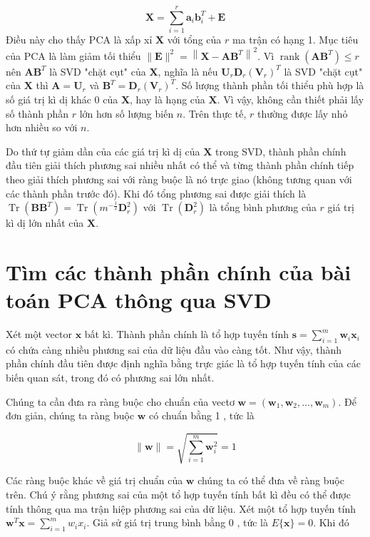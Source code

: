 \documentclass[14pt,oneside,a4paper]{report}
\numberwithin{equation}{section}
\begin{document}
$$
\mathbf{X}=\sum_{i=1}^{r} \mathbf{a}_{i} \mathbf{b}_{i}^{T}+\mathbf{E}
$$
Điều này cho thấy $\mathrm{PCA}$ là xấp xỉ $\mathbf{X}$ với tổng của $r$ ma trận có hạng 1.
Mục tiêu của PCA là làm giảm tối thiểu $\|\mathbf{E}\|^{2}=\left\|\mathbf{X}-\mathbf{A} \mathbf{B}^{T}\right\|^{2}$. Vì $\operatorname{rank}\left(\mathbf{A} \mathbf{B}^{T}\right) \leq r$ nên $\mathbf{A} \mathbf{B}^{T}$ là SVD "chặt cụt" của $\mathbf{X}$, nghĩa là nếu $\mathbf{U}_{r} \mathbf{D}_{r}\left(\mathbf{V}_{r}\right)^{T}$ là SVD "chặt cụt" của $\mathbf{X}$ thì $\mathbf{A}= \mathbf{U}_{r}$ và $\mathbf{B}^{T}= \mathbf{D}_{r}\left(\mathbf{V}_{r}\right)^{T}$. Số lượng thành phần tối thiểu phù hợp là số giá trị kì dị khác 0 của $\mathbf{X}$, hay là hạng của $\mathbf{X}$. Vì vậy, không cần thiết phải lấy số thành phần $r$ lớn hơn số lượng biến $n$. Trên thực tế, $r$ thường được lấy nhỏ hơn nhiều so với $n$.

Do thứ tự giảm dần của các giá trị kì dị của $\mathbf{X}$ trong SVD, thành phần chính đầu tiên giải thích phương sai nhiều nhất có thể và từng thành phần chính tiếp theo giải thích phương sai với ràng buộc là nó trực giao (không tương quan với các thành phần trước đó). Khi đó tổng phương sai được giải thích là $\operatorname{Tr}\left(\mathbf{B} \mathbf{B}^{T}\right)=\operatorname{Tr}\left(m^{-\frac{1}{2}} \mathbf{D}_{r}^{2}\right)$ với $\operatorname{Tr}\left(\mathbf{D}_{r}^{2}\right)$ là tổng bình phương của $r$ giá trị kì dị lớn nhất của $\mathbf{X}$.

\section{Tìm các thành phần chính của bài toán PCA thông qua SVD}

Xét một vector $\mathbf{x}$ bất kì. Thành phần chính là tổ hợp tuyến tính $\mathbf{s}=\sum_{i=1}^{m} \mathbf{w}_{i} \mathbf{x}_{i}$ có chứa càng nhiều phương sai của dữ liệu đầu vào càng tốt. Như vậy, thành phần chính đầu tiên được định nghĩa bằng trực giác là tổ hợp tuyến tính của các biến quan sát, trong đó có phương sai lớn nhất.

Chúng ta cần đưa ra ràng buộc cho chuẩn của vectơ $\mathbf{w}=\left(\mathbf{w}_{1}, \mathbf{w}_{2}, \ldots, \mathbf{w}_{m}\right)$. Để đơn giản, chúng ta ràng buộc $\mathbf{w}$ có chuẩn bằng 1 , tức là

$$
\|\mathbf{w}\|=\sqrt{\sum_{i=1}^{m} \mathbf{w}_{i}^{2}}=1
$$

Các ràng buộc khác về giá trị chuẩn của $\mathbf{w}$ chúng ta có thể đưa về ràng buộc trên.
Chú ý rằng phương sai của một tổ hợp tuyến tính bất kì đều có thể được tính thông qua ma trận hiệp phương sai của dữ liệu. Xét một tổ hợp tuyến tính $\mathbf{w}^{T} \mathbf{x}=\sum_{i=1}^{m} w_{i} x_{i}$. Giả sử giá trị trung bình bằng 0 , tức là $E\{\mathbf{x}\}=0$. Khi đó
\end{document}
